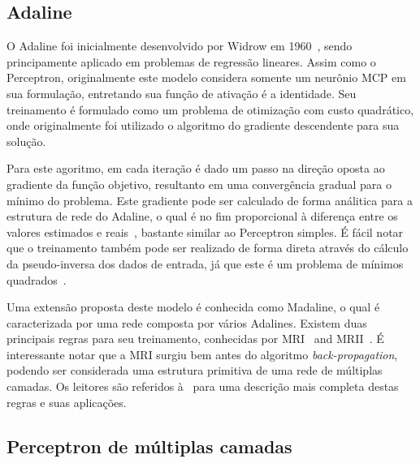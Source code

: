 \documentclass[conference]{IEEEtran}
\begin{document}
	\subsection{Adaline}
	O Adaline foi inicialmente desenvolvido por Widrow em 1960~\cite{widrow1960adaptive}, sendo principamente aplicado em problemas de regressão lineares. Assim como o Perceptron, originalmente este modelo considera somente um neurônio MCP em sua formulação, entretando sua função de ativação é a identidade. Seu treinamento é formulado como um problema de otimização com custo quadrático, onde originalmente foi utilizado o algoritmo do gradiente descendente para sua solução. 
	
	Para este agoritmo, em cada iteração é dado um passo na direção oposta ao gradiente da função objetivo, resultanto em uma convergência gradual para o mínimo do problema. Este gradiente pode ser calculado de forma análitica para a estrutura de rede do Adaline, o qual é no fim proporcional à diferença entre os valores estimados e reais~\cite{widrow1960adaptive}, bastante similar ao Perceptron simples. É fácil notar que o treinamento também pode ser realizado de forma direta através do cálculo da  pseudo-inversa dos dados de entrada, já que este é um problema de mínimos quadrados~\cite{haykin2007neural}.
	
	Uma extensão proposta deste modelo é conhecida como Madaline, o qual é caracterizada por uma rede composta por vários Adalines. Existem duas principais regras para seu treinamento, conhecidas por MRI~\cite{widrow1962generalization} and MRII~\cite{winter1988madaline}. É interessante notar que a MRI surgiu bem antes do algoritmo \textit{back-propagation}, podendo ser considerada uma estrutura primitiva de uma rede de múltiplas camadas. Os leitores são referidos à~\cite{widrow199030} para uma descrição mais completa destas regras e suas aplicações.
	
	   
	
	 
	
		
	\subsection{Perceptron de múltiplas camadas}
	
\end{document}
